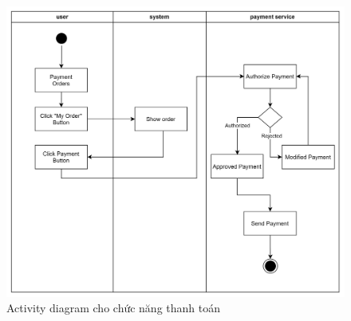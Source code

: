 \newpage
\begin{figure}[h]
    \centering
    \includegraphics[scale = 0.15]{img/activity/payment.png}
    \vspace{1cm}
    \caption{Activity diagram cho chức năng thanh toán}
    \label{fig:taskAssignment}
\end{figure}

\newpage
